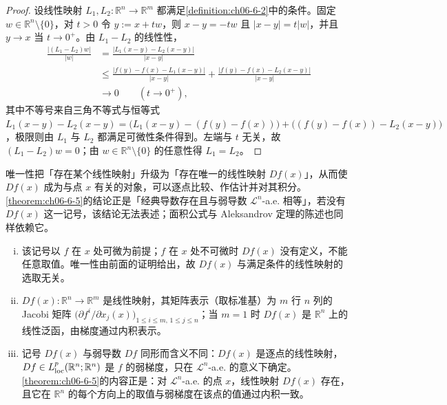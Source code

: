 \documentclass[../../main.tex]{subfiles}%
\begin{document}
\begin{proof}
设线性映射 $L_1,L_2:\mathbb{R}^n\to\mathbb{R}^m$ 都满足\cref{definition:ch06-6-2}中的条件。固定 $w\in\mathbb{R}^n\setminus\{0\}$，对 $t>0$ 令 $y:=x+tw$，则 $x-y=-tw$ 且 $\lvert x-y\rvert=t\lvert w\rvert$，并且 $y\to x$ 当 $t\to0^{+}$。由 $L_1-L_2$ 的线性性，%
\begin{align*}
\frac{\lvert (L_1-L_2)w\rvert}{\lvert w\rvert}
&=\frac{\lvert L_1(x-y)-L_2(x-y)\rvert}{\lvert x-y\rvert}\\
&\leqslant\frac{\lvert f(y)-f(x)-L_1(x-y)\rvert}{\lvert x-y\rvert}+\frac{\lvert f(y)-f(x)-L_2(x-y)\rvert}{\lvert x-y\rvert}\\
&\longrightarrow0\qquad(t\to0^{+}),
\end{align*}
其中不等号来自三角不等式与恒等式 $L_1(x-y)-L_2(x-y)=\bigl(L_1(x-y)-(f(y)-f(x))\bigr)+\bigl((f(y)-f(x))-L_2(x-y)\bigr)$，极限则由 $L_1$ 与 $L_2$ 都满足可微性条件得到。左端与 $t$ 无关，故 $(L_1-L_2)w=0$；由 $w\in\mathbb{R}^n\setminus\{0\}$ 的任意性得 $L_1=L_2$。%
\end{proof}

\begin{remark}\label{remark:ch06-def-6-2-导数-动机}
唯一性把「存在某个线性映射」升级为「存在唯一的线性映射 $Df(x)$」，从而使 $Df(x)$ 成为与点 $x$ 有关的对象，可以逐点比较、作估计并对其积分。\cref{theorem:ch06-6-5}的结论正是「经典导数存在且与弱导数 $\mathcal{L}^{n}$-a.e. 相等」，若没有 $Df(x)$ 这一记号，该结论无法表述；面积公式与 Aleksandrov 定理的陈述也同样依赖它。%
\end{remark}

\begin{remark}\label{remark:ch06-def-6-2-导数-条件}
\begin{enumerate}[(i)]
\item 该记号以 $f$ 在 $x$ 处可微为前提；$f$ 在 $x$ 处不可微时 $Df(x)$ 没有定义，不能任意取值。唯一性由前面的证明给出，故 $Df(x)$ 与满足条件的线性映射的选取无关。
\item $Df(x):\mathbb{R}^n\to\mathbb{R}^m$ 是线性映射，其矩阵表示（取标准基）为 $m$ 行 $n$ 列的 Jacobi 矩阵 $\bigl(\partial f^{i}/\partial x_{j}(x)\bigr)_{1\leqslant i\leqslant m,\,1\leqslant j\leqslant n}$；当 $m=1$ 时 $Df(x)$ 是 $\mathbb{R}^n$ 上的线性泛函，由梯度通过内积表示。
\item 记号 $Df(x)$ 与弱导数 $Df$ 同形而含义不同：$Df(x)$ 是逐点的线性映射，$Df\in L^{p}_{\mathrm{loc}}(\mathbb{R}^n;\mathbb{R}^n)$ 是 $f$ 的弱梯度，只在 $\mathcal{L}^{n}$-a.e. 的意义下确定。\cref{theorem:ch06-6-5}的内容正是：对 $\mathcal{L}^{n}$-a.e. 的点 $x$，线性映射 $Df(x)$ 存在，且它在 $\mathbb{R}^n$ 的每个方向上的取值与弱梯度在该点的值通过内积一致。%
\end{enumerate}
\end{remark}
\end{document}

